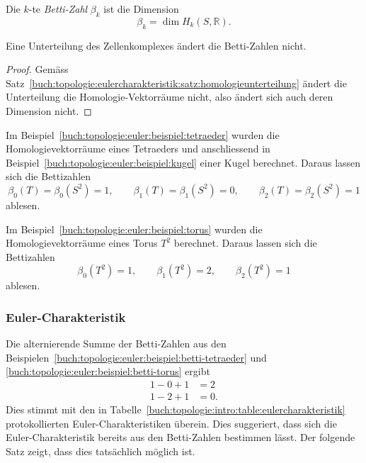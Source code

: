 \begin{definition}
Die $k$-te \emph{Betti-Zahl} $\beta_k$ ist die Dimension
\[
\beta_k
=
\dim H_k(S,\mathbb{R}).
\]
%
\end{definition}

\begin{satz}
Eine Unterteilung des Zellenkomplexes ändert die Betti-Zahlen nicht.
\end{satz}

\begin{proof}
Gemäss Satz~\ref{buch:topologie:eulercharakteristik:satz:homologieunterteilung}
ändert die Unterteilung die Homologie-Vektorräume nicht, also ändert sich
auch deren Dimension nicht.
\end{proof}

\begin{beispiel}
\label{buch:topologie:euler:beispiel:betti-tetraeder}
Im Beispiel~\ref{buch:topologie:euler:beispiel:tetraeder} wurden die 
Homologievektorräume eines Tetraeders und anschliessend in
Beispiel~\ref{buch:topologie:euler:beispiel:kugel} einer Kugel berechnet.
Daraus lassen sich die Bettizahlen
\[
\beta_0(T) = \beta_0(S^2) = 1,\qquad
\beta_1(T) = \beta_1(S^2) = 0,\qquad
\beta_2(T) = \beta_2(S^2) = 1
\]
ablesen.
\end{beispiel}

\begin{beispiel}
\label{buch:topologie:euler:beispiel:betti-torus}
Im Beispiel~\ref{buch:topologie:euler:beispiel:torus} wurden die 
Homologievektorräume eines Torus $T^2$ berechnet.
Daraus lassen sich die Bettizahlen
\[
\beta_0(T^2) = 1,\qquad
\beta_1(T^2) = 2,\qquad
\beta_2(T^2) = 1
\]
ablesen.
\end{beispiel}

%
%
\subsubsection{Euler-Charakteristik}
Die alternierende Summe der Betti-Zahlen aus den
Beispielen~\ref{buch:topologie:euler:beispiel:betti-tetraeder}
und \ref{buch:topologie:euler:beispiel:betti-torus} ergibt
\begin{align*}
1-0+1 &= 2 \\
1-2+1 &= 0.
\end{align*}
Dies stimmt mit den in
Tabelle~\ref{buch:topologie:intro:table:eulercharakteristik}
protokollierten Euler-Charakteristiken überein.
Dies suggeriert, dass sich die Euler-Charakteristik bereits aus
den Betti-Zahlen bestimmen lässt.
Der folgende Satz zeigt, dass dies tatsächlich möglich ist.

